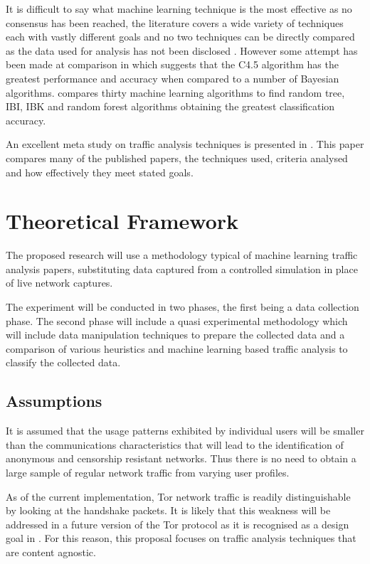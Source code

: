 \documentclass{ecuthesis}
\begin{document}
It is difficult to say what machine learning technique is the most effective as
no consensus has been reached, the literature covers a wide variety of
techniques each with vastly different goals and no two techniques can be
directly compared as the data used for analysis has not been disclosed
\parencite{Kim:2007p3867}. However some attempt has been made at comparison in
\textcite{Williams:2006p3849} which suggests that the C4.5 algorithm has the
greatest performance and accuracy when compared to a number of Bayesian
algorithms. \textcite{Mohd:2009p6484} compares thirty machine learning
algorithms  to find random tree, IBI, IBK and random forest algorithms
obtaining the greatest classification accuracy.

An excellent meta study on traffic analysis techniques is presented in
\textcite{Nguyen:2008p3837}. This paper compares many of the published papers,
the techniques used, criteria analysed and how effectively they meet stated
goals.

\chapter{Theoretical Framework}

The proposed research will use a methodology typical of machine learning
traffic analysis papers, substituting data captured from a controlled
simulation in place of live network captures.

The experiment will be conducted in two phases, the first being a data
collection phase. The second phase will include a quasi experimental
methodology which will include data manipulation techniques to prepare the
collected data and a comparison of various heuristics and machine learning
based traffic analysis to classify the collected data.

\section{Assumptions}

It is assumed that the usage patterns exhibited by individual users will be
smaller than the communications characteristics that will lead to the
identification of anonymous and censorship resistant networks. Thus there is no
need to obtain a large sample of regular network traffic from varying user
profiles.

As of the current implementation, Tor network traffic is readily
distinguishable by looking at the handshake packets. It is likely that this
weakness will be addressed in a future version of the Tor protocol as it is
recognised as a design goal in \textcite{Dingledine:2008p1542}. For this
reason, this proposal focuses on traffic analysis techniques that are content
agnostic.
\end{document}
